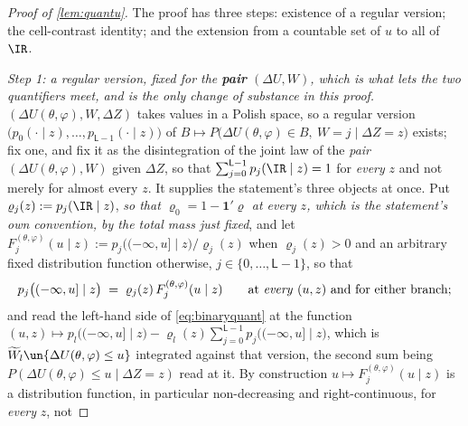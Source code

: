 \begin{proof}[Proof of \cref{lem:quantu}]
The proof has three steps: existence of a regular version; the cell-contrast identity; and the extension
from a countable set of $u$ to all of $\IR$.

\emph{Step 1: a regular version, fixed for the \textbf{pair} $(\Delta U,W)$, which is what lets the
two quantifiers meet, and is the only change of substance in this proof.}
$(\Delta U(\theta,\varphi),W,\Delta Z)$ takes values in a Polish space, so a regular version
$\big(p_0(\cdot\mid z),\dots,p_{\mathsf L-1}(\cdot\mid z)\big)$ of
$B\mapsto P\big(\Delta U(\theta,\varphi)\in B,\ W=j\mid\Delta Z=z\big)$ exists; fix one, and fix it as the
disintegration of the joint law of the \emph{pair} $(\Delta U(\theta,\varphi),W)$ given $\Delta Z$, so
that $\sum_{j=0}^{\mathsf L-1}p_j(\IR\mid z)=1$ for \emph{every} $z$ and not merely for almost every $z$.
It supplies the
statement's three objects at once. Put $\varrho_j(z):=p_j(\IR\mid z)$, \emph{so that
$\varrho_0=1-\mathbf 1'\varrho$ at every $z$, which is the statement's own convention, by the total mass
just fixed}, and let
$F^{(\theta,\varphi)}_j(u\mid z):=p_j\big((-\infty,u]\mid z\big)/\varrho_j(z)$ when $\varrho_j(z)>0$ and
an arbitrary fixed distribution function otherwise, $j\in\{0,\dots,\mathsf L-1\}$, so that
\[
p_j\big((-\infty,u]\mid z\big)\;=\;\varrho_j(z)\,F^{(\theta,\varphi)}_j(u\mid z)
\qquad\text{at \emph{every} }(u,z)\text{ and for either branch;}
\]
and read the left-hand side of \eqref{eq:binaryquant} at the function
$(u,z)\mapsto p_l\big((-\infty,u]\mid z\big)-\varrho_l(z)\sum_{j=0}^{\mathsf L-1}p_j\big((-\infty,u]\mid z\big)$,
which is $\widetilde W_l\un\{\Delta U(\theta,\varphi)\le u\}$ integrated against that version, the second
sum being $P(\Delta U(\theta,\varphi)\le u\mid\Delta Z=z)$ read at it.
By construction $u\mapsto F_j^{(\theta,\varphi)}(u\mid z)$ is a
distribution function, in particular non-decreasing and right-continuous, for \emph{every} $z$, not

\end{proof}
